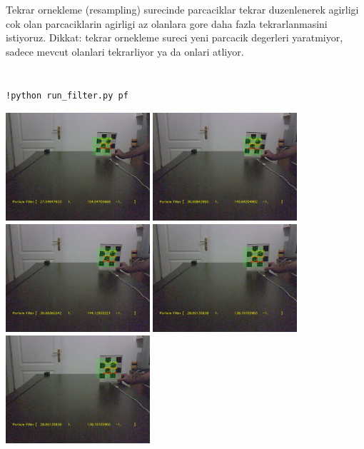 \documentclass[12pt,fleqn]{article}\usepackage{../common}
\begin{document}
Tekrar ornekleme (resampling) surecinde parcaciklar tekrar duzenlenerek
agirligi cok olan parcaciklarin agirligi az olanlara gore daha fazla
tekrarlanmasini istiyoruz. Dikkat: tekrar ornekleme sureci yeni parcacik
degerleri yaratmiyor, sadece mevcut olanlari tekrarliyor ya da onlari
atliyor.

\inputminted{python}{PF.py}

\inputminted{python}{track-chess-pf.py}

\begin{verbatim}
!python run_filter.py pf
\end{verbatim}

\includegraphics[height=4cm]{cb-pf-1.jpg}
\includegraphics[height=4cm]{cb-pf-2.jpg}
\includegraphics[height=4cm]{cb-pf-3.jpg}
\includegraphics[height=4cm]{cb-pf-4.jpg}
\includegraphics[height=4cm]{cb-pf-4.jpg}
\end{document}
